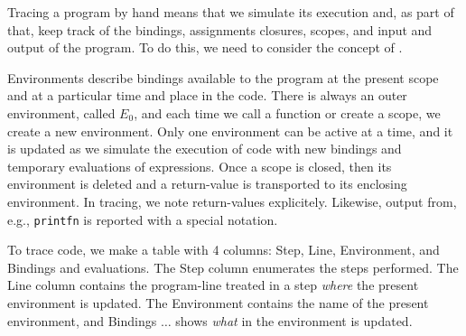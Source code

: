 \documentclass[springer.tex]{subfiles}
\begin{document}
Tracing a program by hand means that we simulate its execution and, as part of that, keep track of the bindings, assignments closures, scopes, and input and output of the program. To do this, we need to consider the concept of .

Environments describe bindings available to the program at the present scope and at a particular time and place in the code. There is always an outer environment, called $E_0$, and each time we call a function or create a scope, we create a new environment. Only one environment can be active at a time, and it is updated as we simulate the execution of code with new bindings and temporary evaluations of expressions. Once a scope is closed, then its environment is deleted and a return-value is transported to its enclosing environment. In tracing, we note return-values explicitely. Likewise, output from, e.g., \lstinline{printfn} is reported with a special notation.

To trace code, we make a table with 4 columns: Step, Line, Environment, and Bindings and evaluations. The Step column enumerates the steps performed. The Line column contains the program-line treated in a step {\em where} the present environment is updated. The Environment contains the name of the present environment, and Bindings $\ldots$ shows {\em what}  in the environment is updated.
\end{document}

